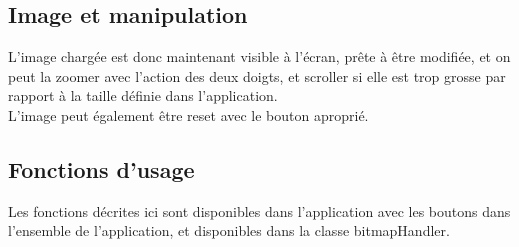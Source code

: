 \documentclass[12pt]{article}
\begin{document}
    \subsection{Image et manipulation}
    L'image chargée est donc maintenant visible à l'écran, prête à être modifiée, et on peut la zoomer avec l'action des deux doigts, 
    et scroller si elle est trop grosse par rapport à la taille définie dans l'application.\\
    L'image peut également être reset avec le bouton aproprié.
    

    \subsection{Fonctions d'usage}
    Les fonctions décrites ici sont disponibles dans l'application avec les boutons dans l'ensemble de l'application, et disponibles dans la classe bitmapHandler.\\
\end{document}
